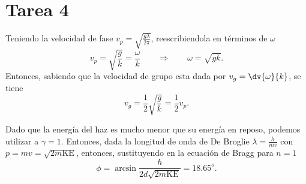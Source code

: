 \section*{Tarea 4}
\begin{mdframed}[style=warning]
	\begin{ejercicio}
		Teniendo la velocidad de fase $v_p = \sqrt{\frac{g\lambda}{2\pi}}$, reescribiendola en términos de $\omega$
			$$ v_p = \sqrt{\frac{g}{k}} = \frac{\omega}{k} \qquad \Rightarrow \qquad \omega = \sqrt{gk}. $$
		Entonces, sabiendo que la velocidad de grupo esta dada por $v_g = \dv{\omega}{k}$, se tiene
			$$ v_g = \frac{1}{2} \sqrt{\frac{g}{k}} = \frac{1}{2} v_p. $$
	\end{ejercicio}
\end{mdframed}


\begin{mdframed}[style=warning]
	\begin{ejercicio}
		Dado que la energía del haz es mucho menor que su energía en reposo, podemos utilizar a $\gamma = 1$. Entonces, dada la longitud de onda de De Broglie $\lambda = \frac{h}{mv}$ con $p = mv = \sqrt{2m\text{KE}}$, entonces, sustituyendo en la ecuación de Bragg para $n = 1$
			$$ \phi = \arcsin{\frac{h}{2d\sqrt{2m\text{KE}}}} = 18.65^o. $$
	\end{ejercicio}
\end{mdframed}

